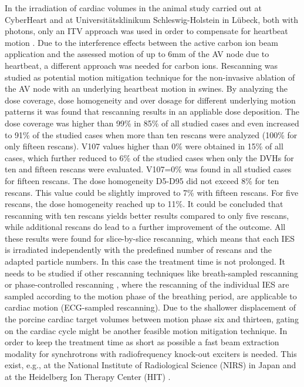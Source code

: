In the irradiation of cardiac volumes in the animal study carried out at CyberHeart and at Universit\"atsklinikum 
Schleswig-Holstein in L\"ubeck, both with photons, only an ITV approach was used in order to compensate for heartbeat motion \cite{Sha10, Bla13}. 
Due to the interference effects between the active carbon ion beam application and the assessed motion of up to 6mm of the AV node due to heartbeat, 
a different approach was needed for carbon ions. Rescanning was studied as potential motion mitigation technique for the non-invasive 
ablation of the AV node with an underlying heartbeat motion in swines.\newline
\newline
By analyzing the dose coverage, dose homogeneity and over dosage for different underlying motion patterns it was found that rescanning results 
in an appliable dose deposition. The dose coverage was higher than 99\% in 85\% of all studied cases 
and even increased to 91\% of the studied cases when more than ten rescans were analyzed (100\% for only fifteen rescans). V107 values 
higher than 0\% were obtained in 15\% of all cases, which further reduced to 6\% of the studied cases when only the DVHs for ten and fifteen 
rescans were evaluated. V107=0\% was found in all studied cases for fifteen rescans. The dose homogeneity D5-D95 did not exceed 8\% for ten 
rescans. This value could be slightly improved to 7\% with fifteen rescans. For five rescans, the dose homogeneity reached up to 11\%.
It could be concluded that rescanning with ten rescans yields better results compared to only five rescans, while 
additional rescans do lead to a further improvement of the outcome.\newline
\newline
All these results were found for slice-by-slice rescanning, which means that each IES is irradiated independently with the predefined number 
of rescans and the adapted particle numbers. In this case the treatment time is not prolonged. It needs to be studied if other rescanning 
techniques like breath-sampled rescanning \cite{Sec09} or phase-controlled rescanning \cite{Fur07}, where the rescanning of the individual IES 
are sampled according to the motion phase of the breathing period, are applicable to cardiac motion (ECG-sampled rescanning). Due to the 
shallower displacement of the porcine cardiac target volumes between motion phase six and thirteen, gating \cite{Kub96} on the cardiac cycle 
might be another feasible motion mitigation technique. In order to keep the treatment time as short as possible a fast beam extraction 
modality for synchrotrons with radiofrequency knock-out exciters is needed. This exist, e.g., at the National Institute of Radiological 
Science (NIRS) in Japan \cite{Nod96, Fur05} and at the Heidelberg Ion Therapy Center (HIT) \cite{Schoe11}. 


